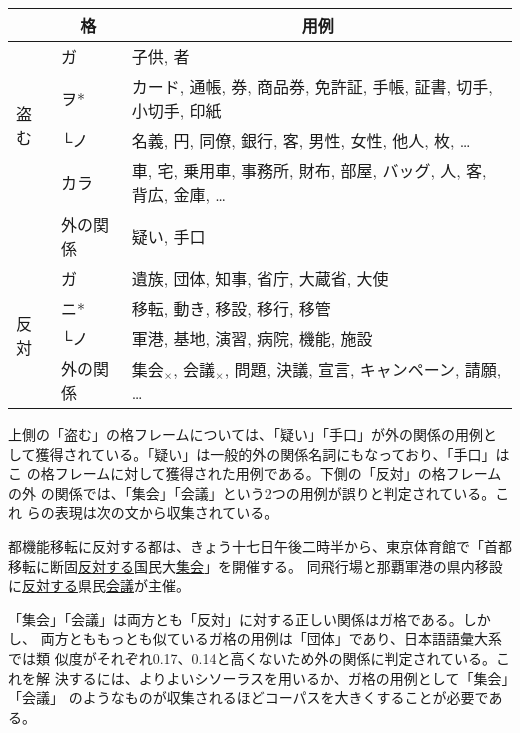 \documentclass[fleqn]{nlp}
\newcommand{\sm}[1]{}
\begin{document}
 \begin{tabular}{l|l|l} \hline
                         & \multicolumn{1}{c|}{格} & \multicolumn{1}{c}{用例} \\ \hline
 \multirow{4}{2zw}{盗む} & ガ  & 子供, 者 \\
                         & ヲ* & カード, 通帳, 券, 商品券, 免許証, 手帳, 証書, 切手, 小切手, 印紙 \\
                         & └ノ& 名義, \sm{数量}円, 同僚, 銀行, 客, 男性, 女性, 他人, \sm{数量}枚, … \\
                         & カラ & 車, 宅, 乗用車, 事務所, 財布, 部屋, バッグ, 人, 客, 背広, 金庫, … \\
                         & 外の関係 & 疑い, 手口 \\ \hline
 \multirow{4}{2zw}{反対} & ガ  & 遺族, 団体, 知事, 省庁, 大蔵省, 大使 \\
                         & ニ* & 移転, 動き, 移設, 移行, 移管 \\
                         & └ノ& 軍港, 基地, 演習, 病院, 機能, 施設 \\
                         & 外の関係 & 集会$_{×}$, 会議$_{×}$, 問題, 決議, 宣言, キャンペーン, 請願, … \\ \hline
 \end{tabular}

\vspace*{3ex}

上側の「盗む」の格フレームについては、「疑い」「手口」が外の関係の用例と
して獲得されている。「疑い」は一般的外の関係名詞にもなっており、「手口」はこ
の格フレームに対して獲得された用例である。下側の「反対」の格フレームの外
の関係では、「集会」「会議」という2つの用例が誤りと判定されている。これ
らの表現は次の文から収集されている。
\begin{exe}
 \ex
 \begin{xlist}
  \ex 都機能移転に反対する都は、きょう十七日午後二時半から、東京体育館で「首都移転に断固\underline{\underline{反対する}}国民大\underline{集会}」を開催する。
  \ex 同飛行場と那覇軍港の県内移設に\underline{\underline{反対する}}県民\underline{会議}が主催。
 \end{xlist}
\end{exe}
「集会」「会議」は両方とも「反対」に対する正しい関係はガ格である。しかし、
両方とももっとも似ているガ格の用例は「団体」であり、日本語語彙大系では類
似度がそれぞれ0.17、0.14と高くないため外の関係に判定されている。これを解
決するには、よりよいシソーラスを用いるか、ガ格の用例として「集会」「会議」
のようなものが収集されるほどコーパスを大きくすることが必要である。
\end{document}
